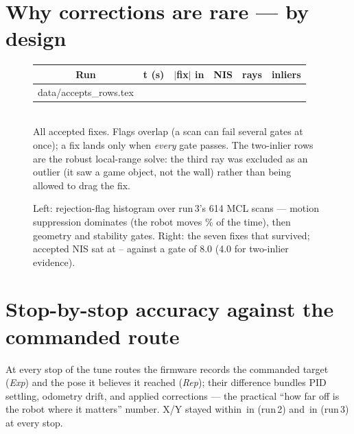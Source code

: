 \documentclass[11pt]{article}
\makeatletter
\newcommand{\rawinput}[1]{\@@input #1 }
\makeatother
\begin{document}
\section{Why corrections are rare --- by design}
\begin{figure}[H]
\centering
{}\hfill
\begin{minipage}[b]{0.44\linewidth}
\scriptsize
{}
\begin{tabular}{c S[table-format=2.1] S[table-format=1.2] S[table-format=1.3] c c}
\toprule
\textbf{Run} & {\textbf{t (s)}} & {\textbf{$|$fix$|$ in}} & {\textbf{NIS}} &
\textbf{rays} & \textbf{inliers}\\
\midrule
\rawinput{data/accepts_rows.tex}
\bottomrule
\end{tabular}\\[4pt]
{\color{subink}All \nValidatedFixes{} accepted fixes. Flags overlap (a scan can fail
several gates at once); a fix lands only when \emph{every} gate passes. The
two-inlier rows are the robust local-range solve: the third ray was excluded as an
outlier (it saw a game object, not the wall) rather than being allowed to drag the
fix.}
\end{minipage}
\caption{Left: rejection-flag histogram over run\,3's 614 MCL scans --- motion
suppression dominates (the robot moves \RunThreeMotionPct\% of the time), then
geometry and stability gates. Right: the seven fixes that survived; accepted NIS sat
at \AcceptNisMin--\AcceptNisMax{} against a gate of 8.0 (4.0 for two-inlier
evidence).}
\end{figure}

\section{Stop-by-stop accuracy against the commanded route}
At every stop of the tune routes the firmware records the commanded target
(\emph{Exp}) and the pose it believes it reached (\emph{Rep}); their difference
bundles PID settling, odometry drift, and applied corrections --- the practical
``how far off is the robot where it matters'' number. X/Y stayed within
\RunTwoCpMax\,in (run\,2) and \RunThreeCpMax\,in (run\,3) at every stop.
\end{document}
